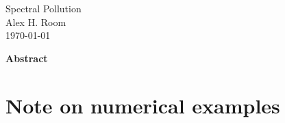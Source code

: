 \documentclass{article}
\newcommand{\1}{\mathbf{1}} %
\begin{document}
  \begin{titlepage}
    \vspace*{\fill}
    \begin{center}
      {\Huge Spectral Pollution}\\[0.5cm]
      {\Large Alex H. Room}\\[0.4cm]
      {\Large \today}
    \end{center}
     \vspace{\fill}
     {\normalsize\textbf{Abstract} {\blindtext}}
     \vspace*{\fill}
  \end{titlepage}
\tableofcontents








\appendix
{}
\section{Note on numerical examples}\label{sec:numerical-note}


\clearpage
\printbibliography
\printindex
\end{document}
